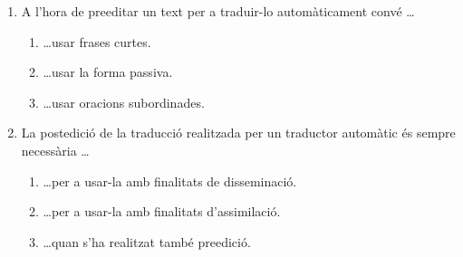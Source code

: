 \begin{enumerate}
\item A l'hora de preeditar un text per a traduir-lo automàticament
  convé \ldots
  \begin{enumerate}
  \item \ldots usar frases curtes.
  \item \ldots usar la forma passiva.
  \item \ldots usar oracions subordinades.
  \end{enumerate}

\item La postedició de la traducció realitzada per un traductor
  automàtic és sempre necessària \ldots
  \begin{enumerate}
  \item \ldots per a usar-la amb finalitats de disseminació.
  \item \ldots per a usar-la amb finalitats d'assimilació.
  \item\ldots quan s'ha realitzat també preedició.
  \end{enumerate}
\end{enumerate}

